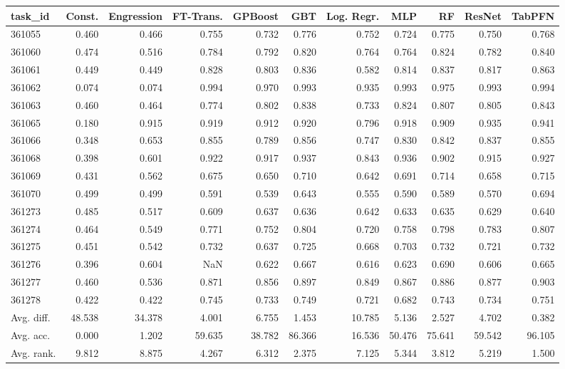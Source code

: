 \begin{tabular}{lrrrrrrrrrr}
\toprule
task\_id & Const. & Engression & FT-Trans. & GPBoost & GBT & Log. Regr. & MLP & RF & ResNet & TabPFN \\
\midrule
361055 & 0.460 & 0.466 & 0.755 & 0.732 & 0.776 & 0.752 & 0.724 & 0.775 & 0.750 & 0.768 \\
361060 & 0.474 & 0.516 & 0.784 & 0.792 & 0.820 & 0.764 & 0.764 & 0.824 & 0.782 & 0.840 \\
361061 & 0.449 & 0.449 & 0.828 & 0.803 & 0.836 & 0.582 & 0.814 & 0.837 & 0.817 & 0.863 \\
361062 & 0.074 & 0.074 & 0.994 & 0.970 & 0.993 & 0.935 & 0.993 & 0.975 & 0.993 & 0.994 \\
361063 & 0.460 & 0.464 & 0.774 & 0.802 & 0.838 & 0.733 & 0.824 & 0.807 & 0.805 & 0.843 \\
361065 & 0.180 & 0.915 & 0.919 & 0.912 & 0.920 & 0.796 & 0.918 & 0.909 & 0.935 & 0.941 \\
361066 & 0.348 & 0.653 & 0.855 & 0.789 & 0.856 & 0.747 & 0.830 & 0.842 & 0.837 & 0.855 \\
361068 & 0.398 & 0.601 & 0.922 & 0.917 & 0.937 & 0.843 & 0.936 & 0.902 & 0.915 & 0.927 \\
361069 & 0.431 & 0.562 & 0.675 & 0.650 & 0.710 & 0.642 & 0.691 & 0.714 & 0.658 & 0.715 \\
361070 & 0.499 & 0.499 & 0.591 & 0.539 & 0.643 & 0.555 & 0.590 & 0.589 & 0.570 & 0.694 \\
361273 & 0.485 & 0.517 & 0.609 & 0.637 & 0.636 & 0.642 & 0.633 & 0.635 & 0.629 & 0.640 \\
361274 & 0.464 & 0.549 & 0.771 & 0.752 & 0.804 & 0.720 & 0.758 & 0.798 & 0.783 & 0.807 \\
361275 & 0.451 & 0.542 & 0.732 & 0.637 & 0.725 & 0.668 & 0.703 & 0.732 & 0.721 & 0.732 \\
361276 & 0.396 & 0.604 & NaN & 0.622 & 0.667 & 0.616 & 0.623 & 0.690 & 0.606 & 0.665 \\
361277 & 0.460 & 0.536 & 0.871 & 0.856 & 0.897 & 0.849 & 0.867 & 0.886 & 0.877 & 0.903 \\
361278 & 0.422 & 0.422 & 0.745 & 0.733 & 0.749 & 0.721 & 0.682 & 0.743 & 0.734 & 0.751 \\
Avg. diff. & 48.538 & 34.378 & 4.001 & 6.755 & 1.453 & 10.785 & 5.136 & 2.527 & 4.702 & 0.382 \\
Avg. acc. & 0.000 & 1.202 & 59.635 & 38.782 & 86.366 & 16.536 & 50.476 & 75.641 & 59.542 & 96.105 \\
Avg. rank. & 9.812 & 8.875 & 4.267 & 6.312 & 2.375 & 7.125 & 5.344 & 3.812 & 5.219 & 1.500 \\
\bottomrule
\end{tabular}
